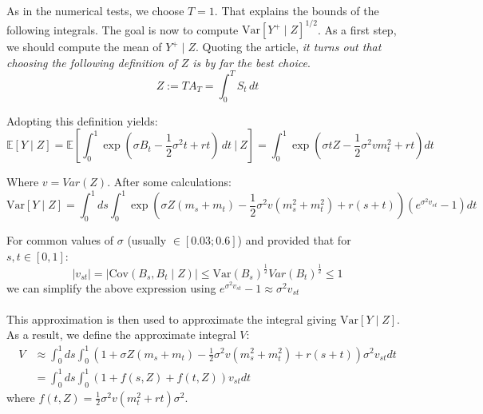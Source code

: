 \documentclass{article}
\begin{document}
As in the numerical tests, we choose $T=1$. That explains the bounds of the following integrals.
The goal is now to compute $\mathrm{Var}[Y^{+}\mid Z]^{1/2}$.
As a first step, we should compute the mean of $Y^{+} \mid Z$.
Quoting the article, \textit{it turns out that choosing the following definition of $Z$ is by far the best choice}.
\[
   	Z := TA_T = \int_{0}^{T} S_{t} \,dt 
\]

Adopting this definition yields:
\[
\mathbb{E}[Y\mid Z]=\mathbb{E}\left[\int_{0}^{1}\exp(\sigma B_{t}-{\textstyle\frac{1}{2}}\sigma^{2}t+r t)\,dt
\ \Big\vert \ Z \right]=\int_{0}^{1}\exp(\sigma tZ-{\textstyle\frac{1}{2}}\sigma^{2}v m_{t}^{2}+r t)dt
\]

Where $v=Var(Z)$. After some calculations:
\[
\mathrm{Var}[Y\mid Z]=\int_{0}^{1}d s\int_{0}^{1}\exp(\sigma Z(m_{s}+m_{t})-{\textstyle{\frac{1}{2}}}\sigma^{2}v(m_{s}^{2}+m_{t}^{2})+r(s+t))(e^{\sigma^{2}v_{s t}}-1)d t
\]

For common values of $\sigma$ (usually $\in[0.03;0.6]$) and provided that for $s,t \in [0,1]$:
\[
	| v_{st} | = | \mathrm{Cov} (B_s,B_t\mid Z)| \leq \mathrm{Var}(B_s)^{\frac{1}{2}} Var(B_t)^{\frac{1}{2}}\leq 1
\]
we can simplify the above expression using $e^{\sigma^{2}v_{s t}}-1\approx \sigma^{2}v_{s t}$\\
\\
This approximation is then used to approximate the integral giving $\mathrm{Var}[Y\mid Z]$.
As a result, we define the approximate integral $V$:
\begin{align*}
	V &\approx \int_{0}^{1} ds\int_{0}^{1}(1+\sigma Z(m_{s}+m_{t})-{\textstyle\frac{1}{2}}
	\sigma^{2}v(m_{s}^{2}+m_{t}^{2})	+r(s+t))\sigma^{2}v_{s t}d t \\
	&=\int_{0}^{1}ds\int_{0}^{1} (1+f(s,Z)+f(t,Z))v_{s t}dt
\end{align*}
where $f(t,Z)=\textstyle\frac{1}{2}\sigma^{2}v(m_{t}^{2}+rt)\sigma^{2}$.
\\
\end{document}
